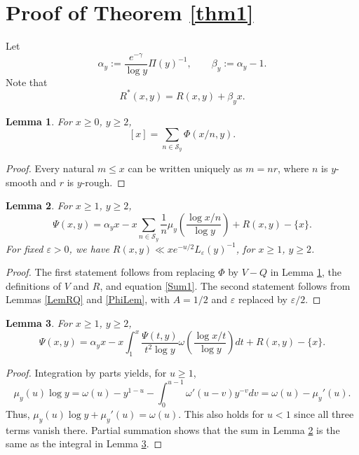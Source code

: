 \documentclass[11pt]{amsart}
\newtheorem{lemma}{Lemma}
\begin{document}
\section{Proof of Theorem \ref{thm1}}\label{SecProof}

Let
$$
\alpha_y:=\frac{e^{-\gamma} }{\log y}\Pi(y)^{-1}, \qquad \beta_y  :=   \alpha_y -1.
$$
Note that 
\begin{equation}\label{RReq}
R^*(x,y)=R(x,y)+\beta_y x.
\end{equation}



\begin{lemma}\label{Lem1}
For $x\ge 0$, $y\ge 2$,
$$
[x] = \sum_{n \in \mathcal{S}_y} \Phi(x/n, y).
$$
\end{lemma}

\begin{proof}
Every natural $m\le x$ can be written uniquely as $m=nr$, where $n$ is $y$-smooth and $r$ is $y$-rough. 
\end{proof}


\begin{lemma}\label{LemFinalSum}
For $x\ge 1$, $y\ge 2$,
$$
\Psi(x,y) = \alpha_y x - x\sum_{n\in \mathcal{S}_y}\frac{1}{n } \mu_y\left(\frac{\log x/n}{\log y }\right)
+R(x,y)-\{x\}.
$$
For fixed $\varepsilon>0$, we have $R(x,y) \ll x e^{-u/2}L_\varepsilon(y)^{-1}$, for $x\ge 1$, $y\ge 2$.
\end{lemma}
\begin{proof}
The first statement follows from replacing $\Phi$ by $V-Q$ in Lemma \ref{Lem1}, the definitions of $V$ and $R$, and equation \eqref{Sum1}.
The second statement follows from Lemmas \ref{LemRQ} and \ref{PhiLem}, with $A=1/2$ and $\varepsilon$ replaced by $\varepsilon/2$.
\end{proof}


\begin{lemma}\label{LemInt}
For $x\ge 1$, $y\ge 2$,
$$
\Psi(x,y) =  \alpha_y x  - x\int_1^x \frac{\Psi(t,y)}{t^2 \log y}\omega\left(\frac{\log x/t}{\log y }\right) dt 
+R(x,y)-\{x\}.
$$
\end{lemma}
\begin{proof}
Integration by parts yields, for $u\ge 1$,
$$
\mu_y(u)\log y = \omega(u) - y^{1-u}-\int_0^{u-1} \omega'(u-v) y^{-v} dv=\omega(u)-\mu_y'(u).
$$
Thus, $\mu_y(u)\log y +\mu_y'(u) = \omega(u)$. This also holds for $u<1$ since all three terms vanish there. 
Partial summation shows that the sum in Lemma \ref{LemFinalSum} is the same as the integral in Lemma \ref{LemInt}.
\end{proof}
\end{document}
